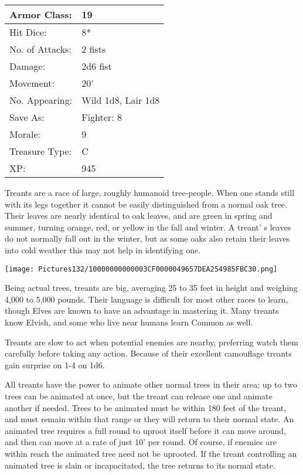 \documentclass[a4paper,twoside,openany,10pt]{book}
\begin{document}
\begin{multicols}{2}
\begin{tabularx}{0.50\textwidth}{@{}lX@{}}
Armor Class: & 19 \\\hline
Hit Dice: & 8* \\\hline
No. of Attacks: & 2 fists \\\hline
Damage: & 2d6 fist \\\hline
Movement: & 20' \\\hline
No. Appearing: & Wild 1d8, Lair 1d8 \\\hline
Save As: & Fighter: 8 \\\hline
Morale: & 9 \\\hline
Treasure Type: & C \\\hline
XP: & 945 \\\hline
\end{tabularx}\medskip

Treants are a race of large, roughly humanoid tree-people. When one stands still with its legs together it cannot be easily distinguished from a normal oak tree. Their leaves are nearly identical to oak leaves, and are green in spring and summer, turning orange, red, or yellow in the fall and winter. A treant' s leaves do not normally fall out in the winter, but as some oaks also retain their leaves into cold weather this may not help in identifying one.

\begin{center} \texttt{[image: Pictures132/10000000000003CF0000049657DEA254985FBC30.png]} \end{center}

Being actual trees, treants are big, averaging 25 to 35 feet in height and weighing 4,000 to 5,000 pounds. Their language is difficult for most other races to learn, though Elves are known to have an advantage in mastering it. Many treants know Elvish, and some who live near humans learn Common as well.

Treants are slow to act when potential enemies are nearby, preferring watch them carefully before taking any action. Because of their excellent camouflage treants gain surprise on 1-4 on 1d6.

All treants have the power to animate other normal trees in their area; up to two trees can be animated at once, but the treant can release one and animate another if needed. Trees to be animated must be within 180 feet of the treant, and must remain within that range or they will return to their normal state. An animated tree requires a full round to uproot itself before it can move around, and then can move at a rate of just 10' per round. Of course, if enemies are within reach the animated tree need not be uprooted. If the treant controlling an animated tree is slain or incapacitated, the tree returns to its normal state.


\end{multicols}
\end{document}
